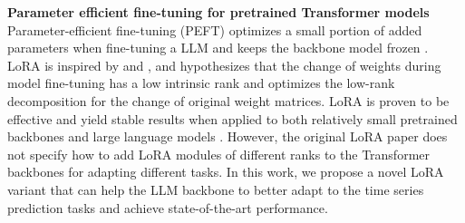 \noindent\textbf{Parameter efficient fine-tuning for pretrained Transformer models} \quad Parameter-efficient fine-tuning (PEFT) optimizes a small portion of added parameters when fine-tuning a LLM and keeps the backbone model frozen \cite{Ding2022DeltaTA,Zhang2023LearnedAA}. LoRA \cite{hu2021lora} is inspired by \cite{aghajanyan-etal-2021-intrinsic} and \cite{2018arXiv180408838L}, and hypothesizes that the change of weights during model fine-tuning has a low intrinsic rank and optimizes the low-rank decomposition for the change of original weight matrices. LoRA \cite{hu2021lora} is proven to be effective and yield stable results when applied to both relatively small pretrained backbones and large language models \cite{2023arXiv230514314D,PromptCBLUE}. However, the original LoRA paper does not specify how to add LoRA modules of different ranks to the Transformer backbones for adapting different tasks. In this work, we propose a novel LoRA variant that can help the LLM backbone to better adapt to the time series prediction tasks and achieve state-of-the-art performance.